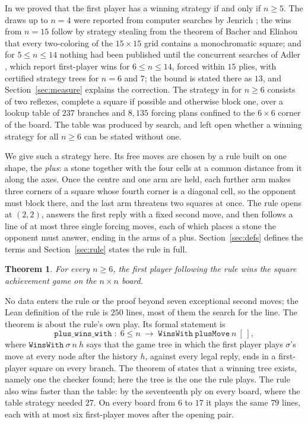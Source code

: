 \documentclass[11pt]{amsart}
\newtheorem{theorem}{Theorem}[section]
\theoremstyle{definition}
\theoremstyle{remark}
\begin{document}
In \cite{reid-threshold} we proved that the first player has a
winning strategy if and only if $n \ge 5$. The draws up to $n = 4$
were reported from computer searches by Jenrich \cite{jenrich}; the
wins from $n = 15$ follow by strategy stealing from the theorem of
Bacher and Eliahou \cite{bacher-eliahou} that every two-coloring of
the $15 \times 15$ grid contains a monochromatic square; and for
$5 \le n \le 14$ nothing had been published until the concurrent
searches of Adler \cite{adler}, which report first-player wins for
$6 \le n \le 14$, forced within $15$ plies, with certified strategy
trees for $n = 6$ and $7$; the bound is stated there as $13$, and
Section~\ref{sec:measure} explains the correction. The strategy in
\cite{reid-threshold} for $n \ge 6$ consists of two reflexes, complete
a square if possible and otherwise block one, over a lookup table of
$237$ branches and $8{,}135$ forcing plans confined to the
$6 \times 6$ corner of the board. The table was produced by search,
and \cite{reid-threshold} left open whether a winning strategy for all
$n \ge 6$ can be stated without one.

We give such a strategy here. Its free moves are chosen by a rule
built on one shape, the \emph{plus}: a stone together with the four
cells at a common distance from it along the axes. Once the centre
and one arm are held, each further arm makes three corners of a square
whose fourth corner is a diagonal cell, so the opponent must block
there, and the last arm threatens two squares at once. The rule opens
at $(2,2)$, answers the first reply with a fixed second move, and then
follows a line of at most three single forcing moves, each of which
places a stone the opponent must answer, ending in the arms of a
plus. Section~\ref{sec:defs} defines the terms and
Section~\ref{sec:rule} states the rule in full.

\begin{theorem}\label{thm:main}
For every $n \ge 6$, the first player following the rule wins the
square achievement game on the $n \times n$ board.
\end{theorem}

No data enters the rule or the proof beyond seven exceptional second
moves; the Lean definition of the rule is $250$ lines, most of them
the search for the line. The theorem is about the rule's own play.
Its formal statement is
\[
  \texttt{plus\_wins\_with} \;:\; 6 \le n \;\longrightarrow\;
  \texttt{WinsWith}\ \texttt{plusMove}\ n\ [\,],
\]
where $\texttt{WinsWith}\ \sigma\ n\ h$ says that the game tree in
which the first player plays $\sigma$'s move at every node after the
history $h$, against every legal reply, ends in a first-player square
on every branch. The theorem of \cite{reid-threshold} states that a
winning tree exists, namely one the checker found; here the tree is
the one the rule plays. The rule also wins faster than the table: by
the seventeenth ply on every board, where the table strategy needed
$27$. On every board from $6$ to $17$ it plays the same $79$ lines,
each with at most six first-player moves after the opening pair.
\end{document}
